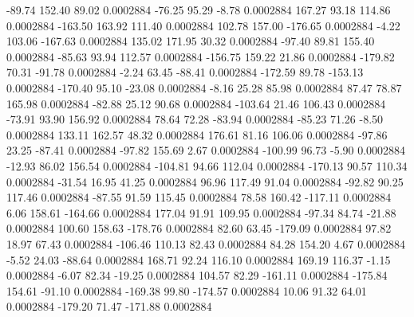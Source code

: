       -89.74      152.40       89.02     0.0002884
      -76.25       95.29       -8.78     0.0002884
      167.27       93.18      114.86     0.0002884
     -163.50      163.92      111.40     0.0002884
      102.78      157.00     -176.65     0.0002884
       -4.22      103.06     -167.63     0.0002884
      135.02      171.95       30.32     0.0002884
      -97.40       89.81      155.40     0.0002884
      -85.63       93.94      112.57     0.0002884
     -156.75      159.22       21.86     0.0002884
     -179.82       70.31      -91.78     0.0002884
       -2.24       63.45      -88.41     0.0002884
     -172.59       89.78     -153.13     0.0002884
     -170.40       95.10      -23.08     0.0002884
       -8.16       25.28       85.98     0.0002884
       87.47       78.87      165.98     0.0002884
      -82.88       25.12       90.68     0.0002884
     -103.64       21.46      106.43     0.0002884
      -73.91       93.90      156.92     0.0002884
       78.64       72.28      -83.94     0.0002884
      -85.23       71.26       -8.50     0.0002884
      133.11      162.57       48.32     0.0002884
      176.61       81.16      106.06     0.0002884
      -97.86       23.25      -87.41     0.0002884
      -97.82      155.69        2.67     0.0002884
     -100.99       96.73       -5.90     0.0002884
      -12.93       86.02      156.54     0.0002884
     -104.81       94.66      112.04     0.0002884
     -170.13       90.57      110.34     0.0002884
      -31.54       16.95       41.25     0.0002884
       96.96      117.49       91.04     0.0002884
      -92.82       90.25      117.46     0.0002884
      -87.55       91.59      115.45     0.0002884
       78.58      160.42     -117.11     0.0002884
        6.06      158.61     -164.66     0.0002884
      177.04       91.91      109.95     0.0002884
      -97.34       84.74      -21.88     0.0002884
      100.60      158.63     -178.76     0.0002884
       82.60       63.45     -179.09     0.0002884
       97.82       18.97       67.43     0.0002884
     -106.46      110.13       82.43     0.0002884
       84.28      154.20        4.67     0.0002884
       -5.52       24.03      -88.64     0.0002884
      168.71       92.24      116.10     0.0002884
      169.19      116.37       -1.15     0.0002884
       -6.07       82.34      -19.25     0.0002884
      104.57       82.29     -161.11     0.0002884
     -175.84      154.61      -91.10     0.0002884
     -169.38       99.80     -174.57     0.0002884
       10.06       91.32       64.01     0.0002884
     -179.20       71.47     -171.88     0.0002884
